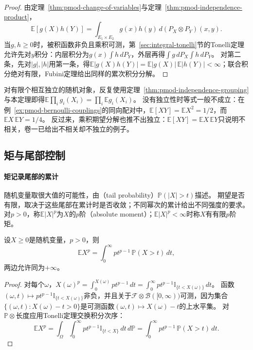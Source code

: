 \begin{proof}
由定理~\ref{thm:pmod-change-of-variables}与定理~\ref{thm:pmod-independence-product}，
\[
  \mathbb E[g(X)h(Y)]=\int_{E_1\times E_2}g(x)h(y)\,d(P_X\otimes P_Y)(x,y).
\]
当$g,h\ge0$时，被积函数非负且乘积可测，第~\ref{sec:integral-tonelli}节的Tonelli定理允许先对$y$积分：内层积分为$g(x)\int h\,dP_Y$，外层再得$\int g\,dP_X\int h\,dP_Y$。
对第二条，先对$|g|,|h|$用第一条，得$\mathbb E|g(X)h(Y)|=\mathbb E|g(X)|\,\mathbb E|h(Y)|<\infty$；联合积分绝对有限，Fubini定理给出同样的累次积分分解。
\end{proof}

对有限个相互独立的随机对象，反复使用定理~\ref{thm:pmod-independence-grouping}与本定理即得$\mathbb E\prod_ig_i(X_i)=\prod_i\mathbb Eg_i(X_i)$。
没有独立性时等式一般不成立：在例~\ref{ex:pmod-bernoulli-couplings}的同向配对中，$\mathbb E[XY]=\mathbb EX^2=1/2$，而$\mathbb EX\,\mathbb EY=1/4$。
反过来，乘积期望分解也推不出独立：$\mathbb E[XY]=\mathbb EX\,\mathbb EY$只说明不相关，卷一已给出不相关却不独立的例子。

\subsection{矩与尾部控制}

\paragraph{矩记录尾部的累计}
随机变量取很大值的可能性，由（tail probability）$\mathbb P(|X|>t)$描述。
期望是否有限，取决于这些尾部在累计时是否收敛；不同幂次的累计给出不同强度的要求。
对$p>0$，称$\mathbb E|X|^p$为$X$的$p$阶（absolute moment）；$\mathbb E|X|^p<\infty$时称$X$有有限$p$阶矩。

\begin{lemma}[尾积分公式]
\label{lem:pmod-tail-formula}
设$X\ge0$是随机变量，$p>0$，则
\[
  \mathbb EX^p=\int_0^\infty pt^{p-1}\,\mathbb P(X>t)\,dt,
\]
两边允许同为$+\infty$。
\end{lemma}

\begin{proof}
对每个$\omega$，$X(\omega)^p=\int_0^{X(\omega)}pt^{p-1}\,dt=\int_0^\infty pt^{p-1}\mathbb I_{\{t<X(\omega)\}}\,dt$。
函数$(\omega,t)\mapsto pt^{p-1}\mathbb I_{\{t<X(\omega)\}}$非负，并且关于$\mathcal F\otimes\mathcal B([0,\infty))$可测，因为集合$\{(\omega,t):X(\omega)-t>0\}$是可测函数$(\omega,t)\mapsto X(\omega)-t$的上水平集。
对$\mathbb P\otimes\text{长度}$应用Tonelli定理交换积分次序：
\[
  \mathbb EX^p=\int_\Omega\int_0^\infty pt^{p-1}\mathbb I_{\{t<X\}}\,dt\,d\mathbb P
  =\int_0^\infty pt^{p-1}\,\mathbb P(X>t)\,dt.
\]
\end{proof}

